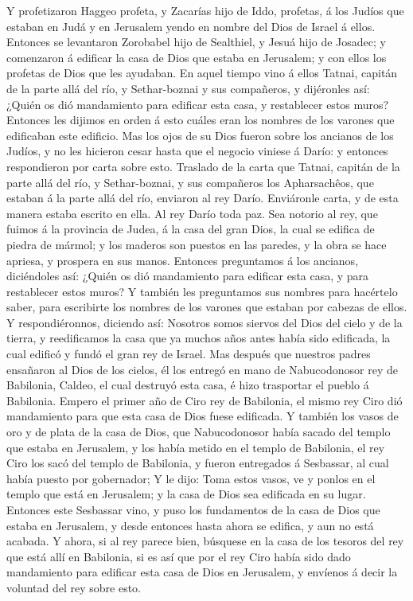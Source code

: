  Y profetizaron Haggeo profeta, y Zacarías hijo de Iddo,
profetas, á los Judíos que estaban en Judá y en Jerusalem yendo en
nombre del Dios de Israel á ellos.  Entonces se levantaron
Zorobabel hijo de Sealthiel, y Jesuá hijo de Josadec; y comenzaron á
edificar la casa de Dios que estaba en Jerusalem; y con ellos los
profetas de Dios que les ayudaban.  En aquel tiempo vino á
ellos Tatnai, capitán de la parte allá del río, y Sethar-boznai y sus
compañeros, y dijéronles así: ¿Quién os dió mandamiento para edificar
esta casa, y restablecer estos muros?  Entonces les dijimos
en orden á esto cuáles eran los nombres de los varones que edificaban
este edificio.  Mas los ojos de su Dios fueron sobre los
ancianos de los Judíos, y no les hicieron cesar hasta que el negocio
viniese á Darío: y entonces respondieron por carta sobre esto.
 Traslado de la carta que Tatnai, capitán de la parte allá
del río, y Sethar-boznai, y sus compañeros los Apharsachêos, que estaban
á la parte allá del río, enviaron al rey Darío.  Enviáronle
carta, y de esta manera estaba escrito en ella. Al rey Darío toda paz.
 Sea notorio al rey, que fuimos á la provincia de Judea, á
la casa del gran Dios, la cual se edifica de piedra de mármol; y los
maderos son puestos en las paredes, y la obra se hace apriesa, y
prospera en sus manos.  Entonces preguntamos á los ancianos,
diciéndoles así: ¿Quién os dió mandamiento para edificar esta casa, y
para restablecer estos muros?  Y también les preguntamos
sus nombres para hacértelo saber, para escribirte los nombres de los
varones que estaban por cabezas de ellos.  Y
respondiéronnos, diciendo así: Nosotros somos siervos del Dios del cielo
y de la tierra, y reedificamos la casa que ya muchos años antes había
sido edificada, la cual edificó y fundó el gran rey de Israel.
 Mas después que nuestros padres ensañaron al Dios de los
cielos, él los entregó en mano de Nabucodonosor rey de Babilonia,
Caldeo, el cual destruyó esta casa, é hizo trasportar el pueblo á
Babilonia.  Empero el primer año de Ciro rey de Babilonia,
el mismo rey Ciro dió mandamiento para que esta casa de Dios fuese
edificada.  Y también los vasos de oro y de plata de la
casa de Dios, que Nabucodonosor había sacado del templo que estaba en
Jerusalem, y los había metido en el templo de Babilonia, el rey Ciro los
sacó del templo de Babilonia, y fueron entregados á Sesbassar, al cual
había puesto por gobernador;  Y le dijo: Toma estos vasos,
ve y ponlos en el templo que está en Jerusalem; y la casa de Dios sea
edificada en su lugar.  Entonces este Sesbassar vino, y
puso los fundamentos de la casa de Dios que estaba en Jerusalem, y desde
entonces hasta ahora se edifica, y aun no está acabada.  Y
ahora, si al rey parece bien, búsquese en la casa de los tesoros del rey
que está allí en Babilonia, si es así que por el rey Ciro había sido
dado mandamiento para edificar esta casa de Dios en Jerusalem, y
envíenos á decir la voluntad del rey sobre esto.

